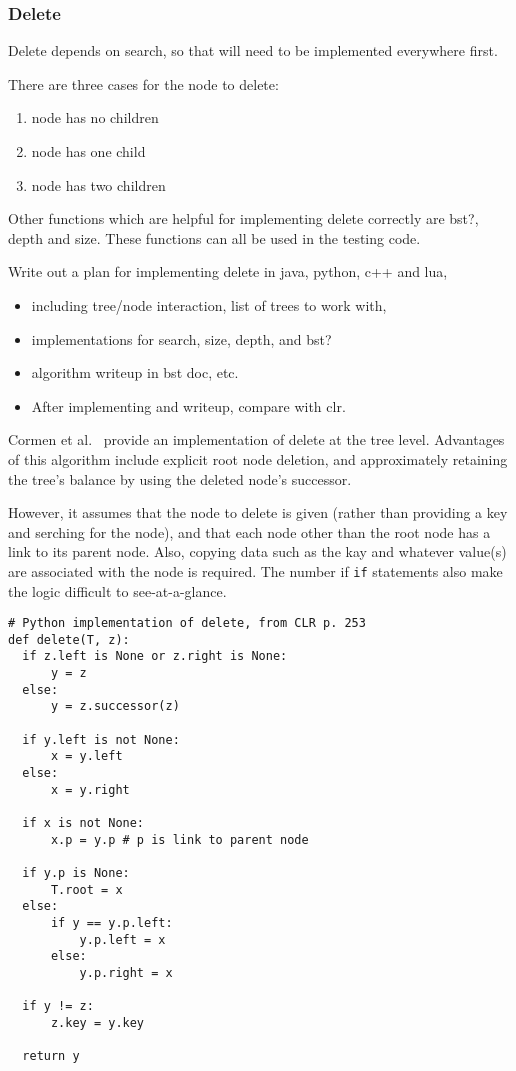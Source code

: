 \documentclass{article}
\begin{document}
\subsubsection{Delete}

Delete depends on search, so that will need to be implemented everywhere first.

There are three cases for the node to delete:

\begin{enumerate}
\item node has no children
\item node has one child
\item node has two children
\end{enumerate}

Other functions which are helpful for implementing delete correctly
are bst?, depth and size. These functions can all be used in the testing
code.

Write out a plan for implementing delete in java, python, c++ and lua,

\begin{itemize}
  \item including tree/node interaction, list of trees to work with,
  \item implementations for search, size, depth, and bst?
  \item algorithm writeup in bst doc, etc.
  \item After implementing and writeup, compare with clr.
\end{itemize}

Cormen et al.~\cite[p. 253]{cormen:th:1990} provide an implementation of
delete at the tree level. Advantages of this algorithm include explicit root node
deletion, and approximately retaining the tree's balance by using the deleted
node's successor.

However, it assumes that the node to delete is
given (rather than providing a key and serching for the node), and that
each node other than the root node has a link to its parent node.
Also, copying data such as the kay and whatever value(s) are associated
with the node is required. The number if {\tt if} statements also make
the logic difficult to see-at-a-glance.

\begin{lstlisting}[frame=single]
# Python implementation of delete, from CLR p. 253
def delete(T, z):
  if z.left is None or z.right is None:
      y = z
  else:
      y = z.successor(z)

  if y.left is not None:
      x = y.left
  else:
      x = y.right

  if x is not None:
      x.p = y.p # p is link to parent node

  if y.p is None:
      T.root = x
  else:
      if y == y.p.left:
          y.p.left = x
      else:
          y.p.right = x

  if y != z:
      z.key = y.key

  return y
\end{lstlisting}
\end{document}
